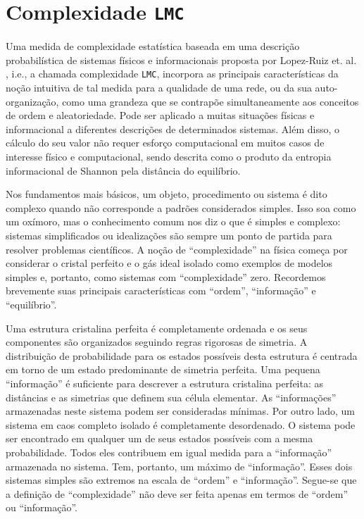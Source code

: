 \documentclass[
	12pt,				%
	openany,oneside,
	a4paper,			%
	english,			%
	brazil,				%
	]{abntex2}
\begin{document}
\section{Complexidade \texttt{LMC}}
Uma medida de complexidade estatística baseada em uma descrição probabilística de sistemas físicos e informacionais proposta por Lopez-Ruiz et. al. \cite{c39}, i.e., a chamada complexidade \texttt{LMC}, incorpora as principais características da noção intuitiva de tal medida para a qualidade de uma rede, ou da sua auto-organização, como uma grandeza que se contrapõe simultaneamente aos conceitos de ordem e aleatoriedade. Pode ser aplicado a muitas situações físicas e informacional a diferentes descrições de determinados sistemas. Além disso, o cálculo do seu valor não requer esforço computacional em muitos casos de interesse físico e computacional, sendo descrita como o produto da entropia informacional de Shannon pela distância do equilíbrio.

Nos fundamentos mais básicos, um objeto, procedimento ou sistema é dito complexo quando não corresponde a padrões considerados simples. Isso soa como um oxímoro, mas o conhecimento comum nos diz o que é simples e complexo: sistemas simplificados ou idealizações são sempre um ponto de partida para resolver problemas científicos. A noção de “complexidade” na física \cite{c7, c8} começa por considerar o cristal perfeito e o gás ideal isolado como exemplos de modelos simples e, portanto, como sistemas com “complexidade” zero. Recordemos brevemente suas principais características com “ordem”, “informação” e “equilíbrio”.

Uma estrutura cristalina perfeita é completamente ordenada e os seus componentes são organizados seguindo regras rigorosas de simetria. A distribuição de probabilidade para os estados possíveis desta estrutura é centrada em torno de um estado predominante de simetria perfeita. Uma pequena “informação” é suficiente para descrever a estrutura cristalina perfeita: as distâncias e as simetrias que definem sua célula elementar. As “informações” armazenadas neste sistema podem ser consideradas mínimas. Por outro lado, um sistema em caos completo isolado é completamente desordenado. O sistema pode ser encontrado em qualquer um de seus estados possíveis com a mesma probabilidade. Todos eles contribuem em igual medida para a “informação” armazenada no sistema. Tem, portanto, um máximo de “informação”. Esses dois sistemas simples são extremos na escala de “ordem” e “informação”. Segue-se que a definição de “complexidade” não deve ser feita apenas em termos de “ordem” ou “informação”.
\end{document}
